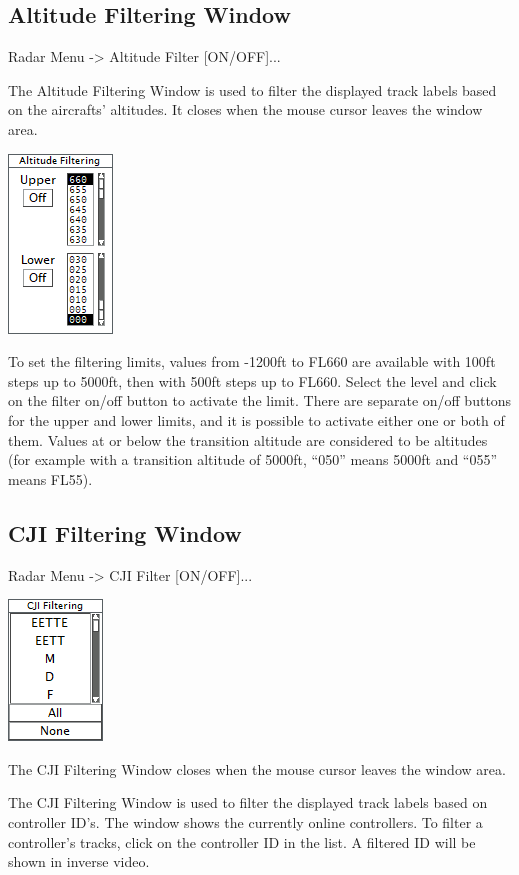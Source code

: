\documentclass[11pt,a4paper,oldfontcommands]{memoir}
\begin{document}
\subsection{Altitude Filtering Window}
\label{win:afw}

Radar Menu -> Altitude Filter [ON/OFF]...

The Altitude Filtering Window is used to filter the displayed track labels based on the aircrafts’ altitudes. It closes when the mouse cursor leaves the window area.

\includegraphics{img/altfil.png}

To set the filtering limits, values from -1200ft to FL660 are available with 100ft steps up to 5000ft, then with 500ft steps up to FL660. Select the level and click on the filter on/off button to activate the limit. There are separate on/off buttons for the upper and lower limits, and it is possible to activate either one or both of them. Values at or below the transition altitude are considered to be altitudes (for example with a transition altitude of 5000ft, “050” means 5000ft and “055” means FL55).

\subsection{CJI Filtering Window}
\label{win:cji}

Radar Menu -> CJI Filter [ON/OFF]...

\includegraphics{img/cji.png}

The CJI Filtering Window closes when the mouse cursor leaves the window area.

The CJI Filtering Window is used to filter the displayed track labels based on controller ID’s. The window shows the currently online controllers. To filter a controller’s tracks, click on the controller ID in the list. A filtered ID will be shown in inverse video.
\end{document}
